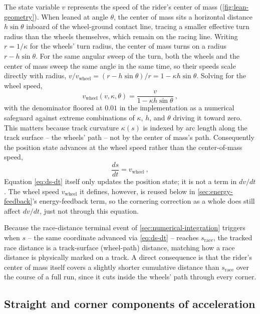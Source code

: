 The state variable $v$ represents the speed of the rider's center of mass
(\cref{fig:lean-geometry}). When
leaned at angle $\theta$, the center of mass sits a horizontal distance
$h \sin\theta$ inboard of the wheel-ground contact line, tracing a smaller
effective turn radius than the wheels themselves, which remain on the racing
line. Writing $r = 1/\kappa$ for the wheels' turn radius, the center of mass
turns on a radius $r - h\sin\theta$. For the same angular sweep of the turn,
both the wheels and the center of mass sweep the same angle in the same time, so
their speeds scale directly with radius,
$v / v_{\mathrm{wheel}} = (r - h\sin\theta)/r = 1 - \kappa h \sin\theta$. Solving
for the wheel speed,
\begin{equation}
    v_{\mathrm{wheel}}(v, \kappa, \theta) =
        \frac{v}{1 - \kappa h \sin\theta}\ ,
    \label{eq:wheel-speed}
\end{equation}
with the denominator floored at $0.01$ in the implementation as a numerical
safeguard against extreme combinations of $\kappa$, $h$, and $\theta$ driving it
toward zero. This matters because track curvature $\kappa(s)$ is indexed by arc
length along the track surface -- the wheels' path -- not by the center of
mass's path. Consequently the position state advances at the wheel speed rather
than the center-of-mass speed,
\begin{equation}
    \frac{ds}{dt} = v_{\mathrm{wheel}}\ ,
    \label{eq:ds-dt}
\end{equation}
Equation \eqref{eq:ds-dt} itself only updates the position state; it is not a
term in $dv/dt$. The wheel speed $v_{\mathrm{wheel}}$ it defines, however, is
reused below in \cref{sec:energy-feedback}'s energy-feedback term, so the
cornering correction as a whole does still affect $dv/dt$, just not through
this equation.

Because the race-distance terminal event of \cref{sec:numerical-integration}
triggers when $s$ -- the same coordinate advanced via \cref{eq:ds-dt} --
reaches $s_{\mathrm{race}}$, the tracked race distance is a track-surface
(wheel-path) distance, matching how a race distance is physically marked on a
track. A direct consequence is that the rider's center of mass itself covers a
slightly shorter cumulative distance than $s_{\mathrm{race}}$ over the course
of a full run, since it cuts inside the wheels' path through every corner.

\subsection{Straight and corner components of acceleration}
\label{sec:accel-components}

